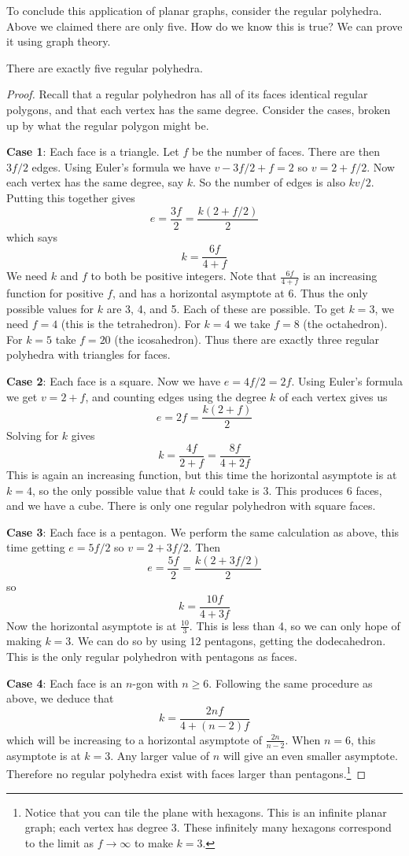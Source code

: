 \documentclass[12pt]{article}
\begin{document}
To conclude this application of planar graphs, consider the regular polyhedra.  Above we claimed there are only five.  How do we know this is true?  We can prove it using graph theory.

\begin{theorem}
There are exactly five regular polyhedra.
\end{theorem}


\begin{proof}
Recall that a regular polyhedron has all of its faces identical regular polygons, and that each vertex has the same degree.   Consider the cases, broken up by what the regular polygon might be.

\textbf{Case 1}: Each face is a triangle.  Let $f$ be the number of faces.  There are then $3f/2$ edges.  Using Euler's formula we have $v - 3f/2 + f = 2$ so $v = 2 + f/2$.  Now each vertex has the same degree, say $k$.  So the number of edges is also $kv/2$.  Putting this together gives \[e = \frac{3f}{2} = \frac{k(2+f/2)}{2}\] which says
\[k = \frac{6f}{4+f}\]
We need $k$ and $f$ to both be positive integers.  Note that $\frac{6f}{4+f}$ is an increasing function for positive $f$, and has a horizontal asymptote at 6.  Thus the only possible values for $k$ are 3, 4, and 5.  Each of these are possible.  To get $k = 3$, we need $f = 4$ (this is the tetrahedron).  For $k = 4$ we take $f = 8$ (the octahedron).  For $k = 5$ take $f = 20$ (the icosahedron).  Thus there are exactly three regular polyhedra with triangles for faces.

\textbf{Case 2}: Each face is a square.  Now we have $e = 4f/2 = 2f$.  Using Euler's formula we get $v = 2 + f$, and counting edges using the degree $k$ of each vertex gives us
\[e = 2f = \frac{k(2+f)}{2}\]
Solving for $k$ gives
\[k = \frac{4f}{2+f} = \frac{8f}{4+2f}\]
This is again an increasing function, but this time the horizontal asymptote is at $k = 4$, so the only possible value that $k$ could take is 3.  This produces 6 faces, and we have a cube.  There is only one regular polyhedron with square faces.

\textbf{Case 3}: Each face is a pentagon.  We perform the same calculation as above, this time getting $e = 5f/2$ so $v = 2 + 3f/2$.  Then
\[e = \frac{5f}{2} = \frac{k(2+3f/2)}{2}\]
so
\[k = \frac{10f}{4+3f}\]
Now the horizontal asymptote is at $\frac{10}{3}$.  This is less than 4, so we can only hope of making $k = 3$.  We can do so by using 12 pentagons, getting the dodecahedron.  This is the only regular polyhedron with pentagons as faces.

\textbf{Case 4}: Each face is an $n$-gon with $n \ge 6$.  Following the same procedure as above, we deduce that
\[k = \frac{2nf}{4+(n-2)f}\]
which will be increasing to a horizontal asymptote of $\frac{2n}{n-2}$.  When $n = 6$, this asymptote is at $k = 3$.  Any larger value of $n$ will give an even smaller asymptote.  Therefore no regular polyhedra exist with faces larger than pentagons.\footnote{Notice that you can tile the plane with hexagons.  This is an infinite planar graph; each vertex has degree 3.  These infinitely many hexagons correspond to the limit as $f \to \infty$ to make $k = 3$.}
\end{proof}
\end{document}
